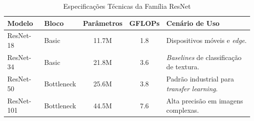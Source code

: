 \begin{table}[ht]
\centering
\caption{Especificações Técnicas da Família ResNet}
\label{tab:resnet_specs}
\begin{tabular}{@{}llcc p{5cm}@{}}
\toprule
\textbf{Modelo} & \textbf{Bloco} & \textbf{Parâmetros} & \textbf{GFLOPs} & \textbf{Cenário de Uso} \\ \midrule
ResNet-18 & Basic & 11.7M & 1.8 & Dispositivos móveis e \textit{edge}. \\
ResNet-34 & Basic & 21.8M & 3.6 & \textit{Baselines} de classificação de textura. \\
ResNet-50 & Bottleneck & 25.6M & 3.8 & Padrão industrial para \textit{transfer learning}. \\
ResNet-101 & Bottleneck & 44.5M & 7.6 & Alta precisão em imagens complexas. \\ \bottomrule
\end{tabular}
\end{table}
